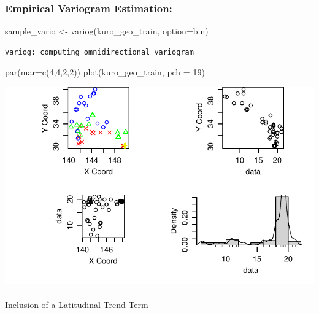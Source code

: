 \documentclass[
  11pt,
]{article}
\makeatletter
\let\oldparagraph\paragraph
\renewcommand{\paragraph}{
    \@ifstar
      \xxxParagraphStar
      \xxxParagraphNoStar
  }
\newcommand{\xxxParagraphStar}[1]{\oldparagraph*{#1}\mbox{}}
\newcommand{\xxxParagraphNoStar}[1]{\oldparagraph{#1}\mbox{}}
\newenvironment{Shaded}{\begin{snugshade}}{\end{snugshade}}
\newcommand{\AttributeTok}[1]{\textcolor[rgb]{0.40,0.45,0.13}{#1}}
\newcommand{\DecValTok}[1]{\textcolor[rgb]{0.68,0.00,0.00}{#1}}
\newcommand{\FunctionTok}[1]{\textcolor[rgb]{0.28,0.35,0.67}{#1}}
\newcommand{\NormalTok}[1]{\textcolor[rgb]{0.00,0.23,0.31}{#1}}
\newcommand{\OtherTok}[1]{\textcolor[rgb]{0.00,0.23,0.31}{#1}}
\newcommand{\StringTok}[1]{\textcolor[rgb]{0.13,0.47,0.30}{#1}}
\makeatother
\begin{document}
\subsubsection{Empirical Variogram
Estimation:}\label{empirical-variogram-estimation}

\begin{Shaded}
\begin{Highlighting}[]
\NormalTok{ sample\_vario }\OtherTok{\textless{}{-}} \FunctionTok{variog}\NormalTok{(kuro\_geo\_train, }\AttributeTok{option=}\StringTok{\textquotesingle{}bin\textquotesingle{}}\NormalTok{)}
\end{Highlighting}
\end{Shaded}

\begin{verbatim}
variog: computing omnidirectional variogram
\end{verbatim}

\begin{Shaded}
\begin{Highlighting}[]
 \FunctionTok{par}\NormalTok{(}\AttributeTok{mar=}\FunctionTok{c}\NormalTok{(}\DecValTok{4}\NormalTok{,}\DecValTok{4}\NormalTok{,}\DecValTok{2}\NormalTok{,}\DecValTok{2}\NormalTok{))}
 \FunctionTok{plot}\NormalTok{(kuro\_geo\_train, }\AttributeTok{pch =} \DecValTok{19}\NormalTok{)}
\end{Highlighting}
\end{Shaded}

\includegraphics{project_files/figure-pdf/unnamed-chunk-6-1.pdf}

\paragraph{Inclusion of a Latitudinal Trend
Term}\label{inclusion-of-a-latitudinal-trend-term}
\end{document}
